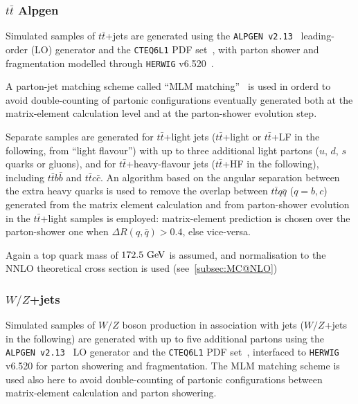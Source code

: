 \subsubsection{$t\bar{t}$ Alpgen}\label{subsec:alpgen}
Simulated samples of $t\bar{t}$+jets are generated using
the {\tt ALPGEN v2.13}~\cite{ALPGEN} leading-order (LO) generator and the 
{\tt CTEQ6L1} PDF set~\cite{cteq6}, with parton shower and fragmentation  
modelled through {\tt HERWIG} v6.520~\cite{HERWIG}.

A parton-jet matching scheme called ``MLM matching''~\cite{mlm} is used
in orderd to avoid double-counting  of partonic configurations
eventually generated both at the matrix-element calculation level
and at the parton-shower evolution step.

Separate samples are generated for $t\bar{t}$+light jets ($t\bar{t}$+light 
or $t\bar{t}$+LF in the following, from ``light flavour'') 
with up to three additional light partons ($u$, $d$, $s$ quarks or gluons),
and for $t\bar{t}$+heavy-flavour jets ($t\bar{t}$+HF in the following), 
including $t\bar{t}b\bar{b}$ and
$t\bar{t}c\bar{c}$.  
An algorithm based on the angular separation
between the extra heavy quarks is used to remove 
the overlap between $t\bar{t}q\bar{q}$ ($q=b,c$) 
generated from the matrix element calculation and 
from parton-shower evolution in the  $t\bar{t}$+light samples
is employed: matrix-element prediction is chosen over the parton-shower one
when $\Delta R(q,\bar{q})>0.4$, else vice-versa.


Again a top quark mass of $172.5\gev$ is assumed, and normalisation to the
NNLO theoretical cross section is used (see~\ref{subsec:MC@NLO})

\subsubsection{$W/Z$+jets}

Simulated samples of $W/Z$ boson production in association with jets
($W/Z$+jets in the following) are generated with up to five additional 
partons using the {\tt ALPGEN v2.13}~\cite{ALPGEN} LO generator and the 
{\tt CTEQ6L1} PDF set~\cite{cteq6}, interfaced to {\tt HERWIG} v6.520 
for parton showering and fragmentation.
The MLM matching scheme is used also here to avoid double-counting of partonic configurations 
between  matrix-element  calculation and parton showering.

